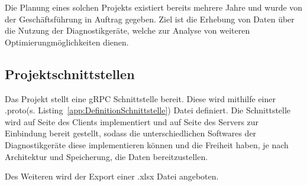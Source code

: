 Die Planung eines solchen Projekts existiert bereits mehrere Jahre und wurde von der Geschäftsführung in Auftrag gegeben. Ziel ist die Erhebung von Daten über die Nutzung der {\betriebNameKzf} Diagnostikgeräte, welche zur Analyse von weiteren Optimierungmöglichkeiten dienen.

\subsection{Projektschnittstellen}
\label{sec:Projektschnittstellen}
Das Projekt stellt eine {\acs{gRPC}} Schnittstelle bereit. Diese wird mithilfe einer \glqq .proto\grqq \xspace (s. Listing~\ref{app:DefinitionSchnittstelle}) Datei definiert. Die Schnittstelle wird auf Seite des Clients implementiert und auf Seite des Servers zur Einbindung bereit gestellt, sodass die unterschiedlichen Softwares der Diagnostikgeräte diese implementieren können und die Freiheit haben, je nach Architektur und Speicherung, die Daten bereitzustellen.

Des Weiteren wird der Export einer \glqq .xlsx\grqq \xspace Datei angeboten.